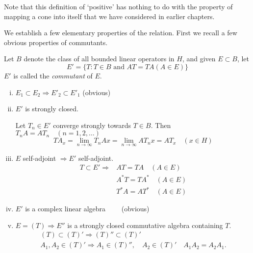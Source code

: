 Note that this definition of `positive' has nothing to do with the
property of mapping a cone into itself that we have considered in
earlier chapters. 

We establish a few elementary properties of the relation. First we
recall a few obvious properties of commutants. 

Let $B$ denote the class of all bounded linear operators in $H$, and
given $E \subset B$, let 
$$
E' = \{ T : T \in B \text{ and } AT=TA (A \in E)\}
$$
$E'$ is called the \textit{commutant} of $E$.
\begin{enumerate}[(i)]
\item $E_1 \subset E_2 \Rightarrow E'_2 \subset E'_1$ \qquad (obvious)
\item $E'$ is strongly closed.

Let $T_n \in E'$ converge strongly towards $T \in B$. Then $T_n A = A
T_n \quad (n=1,2, \ldots)$ 
$$
TA_x=\lim_{n \to \infty} T_n Ax= \lim_{n \to \infty} A T_n x = AT_x
\quad (x \in H) 
$$\pageoriginale

\item $E$ self-adjoint $\Rightarrow E'$ self-adjoint.
\begin{align*}
  T \subset E' \Rightarrow & AT = TA \quad (A \in E)\\
  & A^* T = TA^* \quad(A \in E)\\
  & T^* A = AT^* \quad (A \in E)
\end{align*}

\item $E'$ is a complex linear algebra $\qquad$(obvious)

\item $E = (T) \Rightarrow E''$ is a strongly closed commutative
  algebra containing $T$. 
  \begin{gather*}
    (T) \subset (T)' \Rightarrow (T)'' \subset (T)'\\
    A_1, A_2 \in (T)' \Rightarrow A_1 \in (T)'', \quad A_2 \in (T)'
    \quad A_1 A_2 = A_2 A_1. 
  \end{gather*}
\end{enumerate}

